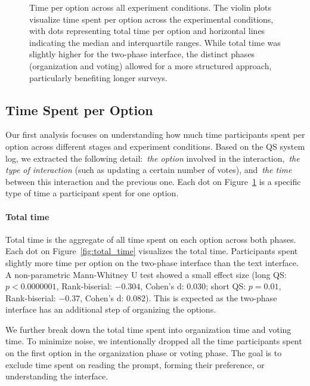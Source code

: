 \begin{figure}[htbp]
{\begin{minipage}{\wd\savefig}
            \usebox{\savefig}
             \captionsetup{width=0.67\pdfpageheight}
            \caption{Time per option across all experiment conditions. The violin plots visualize time spent per option across the experimental conditions, with dots representing total time per option and horizontal lines indicating the median and interquartile ranges. While total time was slightly higher for the two-phase interface, the distinct phases (organization and voting) allowed for a more structured approach, particularly benefiting longer surveys.}
            \label{fig:time_per_option_full}
        \end{minipage}
    }
\end{figure}


\subsection{Time Spent per Option}
\label{sec:time_per_option}
Our first analysis focuses on understanding how much time participants spent per option across different stages and experiment conditions. Based on the QS system log, we extracted the following detail:~\textit{the option}  involved in the interaction,~\textit{the type of interaction} (such as updating a certain number of votes), and~\textit{the time} between this interaction and the previous one. Each dot on Figure~\ref{fig:time_per_option_full} is a specific type of time a participant spent for one option. 

\paragraph{Total time} Total time is the aggregate of all time spent on each option across both phases. Each dot on Figure~\ref{fig:total_time} visualizes the total time. Participants spent slightly more time per option on the two-phase interface than the text interface. A non-parametric Mann-Whitney U test showed a small effect size (long QS: $p<0.0000001$, Rank-biserial: $-0.304$, Cohen's d: $0.030$; short QS: $p=0.01$, Rank-biserial: $-0.37$, Cohen's d: $0.082$). This is expected as the two-phase interface has an additional step of organizing the options. 

We further break down the total time spent into organization time and voting time. To minimize noise, we intentionally dropped all the time participants spent on the first option in the organization phase or voting phase. The goal is to exclude time spent on reading the prompt, forming their preference, or understanding the interface.

